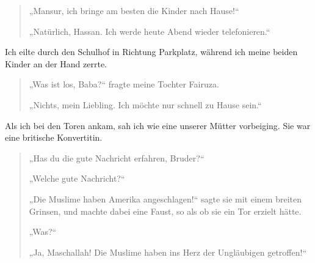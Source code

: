\documentclass[12pt]{memoir}
\begin{document}
\begin{quote}
„Mansur, ich bringe am besten die Kinder nach Hause!“

„Natürlich, Hassan. Ich werde heute Abend wieder telefonieren.“
\end{quote}

Ich eilte durch den Schulhof in Richtung Parkplatz,
während ich meine beiden Kinder an der Hand zerrte.

\begin{quote}
„Was ist los, Baba?“ fragte meine Tochter Fairuza.

„Nichts, mein Liebling.
Ich möchte nur schnell zu Hause sein.“
\end{quote}

Als ich bei den Toren ankam, sah ich wie eine unserer Mütter vorbeiging.
Sie war eine britische Konvertitin.

\begin{quote}
„Has du die gute Nachricht erfahren, Bruder?“

„Welche gute Nachricht?“

„Die Muslime haben Amerika angeschlagen!“ sagte sie mit einem breiten Grinsen,
und machte dabei eine Faust, so als ob sie ein Tor erzielt hätte.

„Was?“

„Ja, Maschallah!
Die Muslime haben ins Herz der Ungläubigen getroffen!“
\end{quote}
\end{document}
